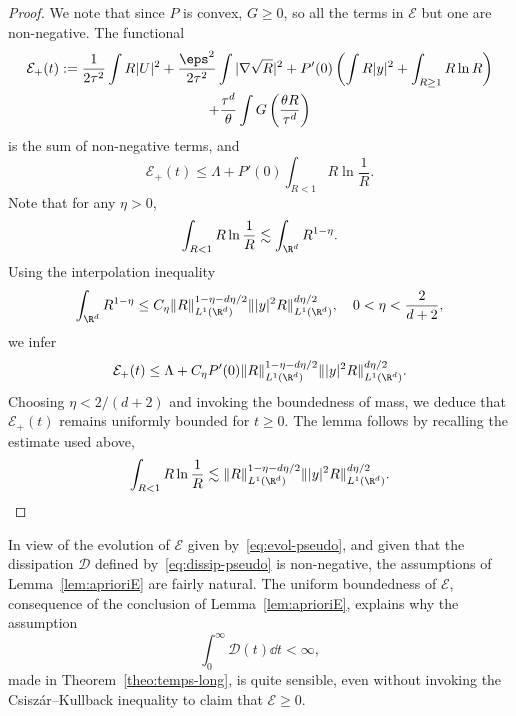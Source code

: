 \begin{proof}
We note that since $P$ is convex, $G\ge0 $, so all the terms in $\mathcal E$ but one are non-negative. The functional
\begin{multline*}
\mathcal E_+(t) := \frac{1}{2\tau^2}\int R|U|^2+\frac{\eps^2}{2\tau^2} \int|\nabla \sqrt R|^2 +P'(0)\left(\int R|y|^2 + \int_{R\ge 1} R \ln R\right) \\
+ \frac{\tau^d}{\theta}\int G\left(\frac{\theta R}{\tau^d}\right)
\end{multline*}
is the sum of non-negative terms, and
\begin{equation*}
\mathcal E_+(t)\le \Lambda+ P'(0)\int_{R< 1} R \ln \frac{1}{R}.
\end{equation*}
Note that for any $\eta>0$,
\begin{equation*}
\int_{R< 1} R \ln \frac{1}{R} \lesssim \int_{\R^d} R^{1-\eta}.
\end{equation*}
Using the interpolation inequality
\begin{equation*}
\int_{\R^d} R^{1-\eta} \le C_{\eta}
\|R\|_{L^1(\R^d)}^{1-\eta-d\eta/2}\||y|^2 R\|_{L^1(\R^d)}^{d\eta/2},\quad 0<\eta<\frac{2}{d+2},
\end{equation*}
we infer
\begin{equation*}
\mathcal E_+(t)\le \Lambda+ C_\eta P'(0)\|R\|_{L^1(\R^d)}^{1-\eta-d\eta/2}\||y|^2 R\|_{L^1(\R^d)}^{d\eta/2}.
\end{equation*}
Choosing $\eta<2/(d+2)$ and invoking the boundedness of mass, we deduce that $ \mathcal E_+(t)$ remains uniformly bounded for $t \ge 0$. The lemma follows by recalling the estimate used above,
\begin{equation*}
\int_{R< 1} R \ln \frac{1}{R} \lesssim
\|R\|_{L^1(\R^d)}^{1-\eta-d\eta/2}\||y|^2 R\|_{L^1(\R^d)}^{d\eta/2}.\qedhere
\end{equation*}
\end{proof}

\begin{rema}
In view of the evolution of $\mathcal E$ given by~\eqref{eq:evol-pseudo}, and given that the dissipation $\mathcal D$ defined by~\eqref{eq:dissip-pseudo} is non-negative, the assumptions of Lemma~\ref{lem:aprioriE} are fairly natural. The uniform boundedness of $\mathcal E$, consequence of the conclusion of Lemma~\ref{lem:aprioriE}, explains why the assumption
\[
\int_0^\infty \mathcal D(t)\dd t<\infty,
\]
made in Theorem~\ref{theo:temps-long}, is quite sensible, even without invoking the Csisz\'ar--Kullback inequality to claim that $\mathcal E\ge 0$.
\end{rema}

